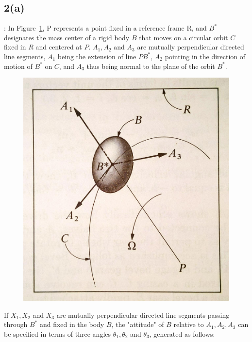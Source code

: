 \subsection{2(a)}

: In Figure~\ref{2_a}, P represents a point fixed in a reference frame R, and $B^*$ designates the mass center of a rigid body $B$ that moves on a circular orbit $C$ fixed in $R$ and centered at $P$. $A_1, A_2$ and $A_3$ are mutually perpendicular directed line segments, $A_1$ being the extension of line $PB^*$, $A_2$ pointing in the direction of motion of $B^*$ on $C$, and $A_3$ thus being normal to the plane of the orbit $B^*$.

\begin{figure}[H]
    \centering
    \includegraphics[scale = 0.15]{./figs/ProbSet_2/2_a.jpg}
    \caption{}
    \label{2_a}
\end{figure}

If $X_1, X_2$ and $X_3$ are mutually perpendicular directed line segments passing through $B^*$ and fixed in the body $B$, the "attitude" of $B$ relative to $A_1, A_2, A_3$ can be specified in terms of three angles $\theta_1, \theta_2$ and $\theta_3$, generated as follows: 

